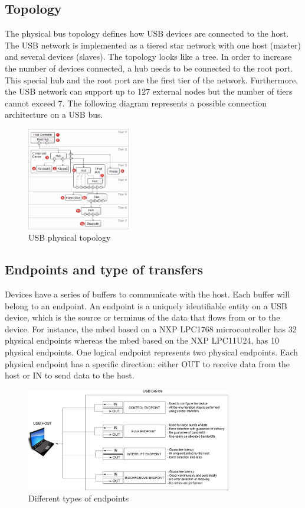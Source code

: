 \documentclass[pdftex,10pt,a4paper]{report}
\begin{document}
\subsection{Topology}
The physical bus topology defines how USB devices are connected to the host. The USB network is implemented as a tiered star network with one host (master) and several devices (slaves). The topology looks like a tree. In order to increase the number of devices connected, a hub needs to be connected to the root port. This special hub and the root port are the first tier of the network. Furthermore, the USB network can support up to 127 external nodes but the number of tiers cannot exceed 7. The following diagram represents a possible connection architecture on a USB bus.


\begin{figure}[h!]
		\centering
		\includegraphics[width=0.4\textwidth]{./usb_topology.jpg}
		\caption{USB physical topology \footnotemark}
		\label{USB physical topology}
\end{figure}
\subsection{Endpoints and type of transfers}
Devices have a series of buffers to communicate with the host. Each buffer will belong to an endpoint. An endpoint is a uniquely identifiable entity on a USB device, which is the source or terminus of the data that flows from or to the device. For instance, the mbed based on a NXP LPC1768 microcontroller has 32 physical endpoints whereas the mbed based on the NXP LPC11U24, has 10 physical endpoints. One logical endpoint represents two physical endpoints. Each physical endpoint has a specific direction: either OUT to receive data from the host or IN to send data to the host. 



\begin{figure}[h!]
		\centering
		\includegraphics[width=0.8\textwidth]{./endpoints.jpg}
		\caption{Different types of endpoints}
		\label{Different types of endpoints}
\end{figure}
\end{document}
